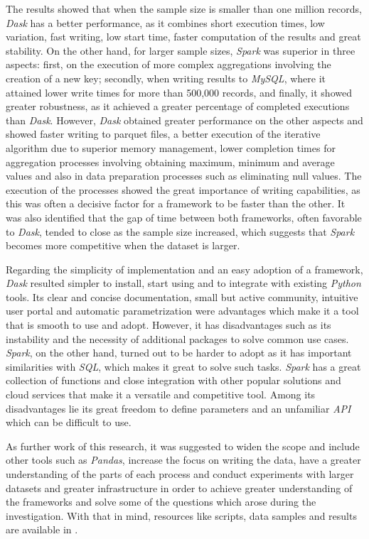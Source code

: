 \documentclass[11pt, oneside]{book}
\begin{document}
The results showed that when the sample size is smaller than one million records, \textit{Dask} has a better performance, as it combines short execution times, low variation, fast writing, low start time, faster computation of the results and great stability. On the other hand, for larger sample sizes, \textit{Spark} was superior in three aspects: first, on the execution of more complex aggregations involving the creation of a new key; secondly, when writing results to \textit{MySQL}, where it attained lower write times for more than 500,000 records, and finally, it showed greater robustness, as it achieved a greater percentage of completed executions than \textit{Dask}. However, \textit{Dask} obtained greater performance on the other aspects and showed faster writing to parquet files, a better execution of the iterative algorithm due to superior memory management, lower completion times for aggregation processes involving obtaining maximum, minimum and average values and also in data preparation processes such as eliminating null values. The execution of the processes showed the great importance of writing capabilities, as this was often a decisive factor for a framework to be faster than the other. It was also identified that the gap of time between both frameworks, often favorable to \textit{Dask}, tended to close as the sample size increased, which suggests that \textit{Spark} becomes more competitive when the dataset is larger. 

Regarding the simplicity of implementation and an easy adoption of a framework, \textit{Dask} resulted simpler to install, start using and to integrate with existing \textit{Python} tools. Its clear and concise documentation, small but active community, intuitive user portal and automatic parametrization were advantages which make it a tool that is smooth to use and adopt. However, it has disadvantages such as its instability and the necessity of additional packages to solve common use cases. \textit{Spark}, on the other hand, turned out to be harder to adopt as it has important similarities with \textit{SQL}, which makes it great to solve such tasks. \textit{Spark} has a  great collection of functions and close integration with other popular solutions and cloud services that make it a versatile and competitive tool. Among its disadvantages lie its great freedom to define parameters and an unfamiliar \textit{API} which can be difficult to use.

As further work of this research, it was suggested to widen the scope and include other tools such as \textit{Pandas}, increase the focus on writing the data, have a greater understanding of the parts of each process and conduct experiments with larger datasets and greater infrastructure in order to achieve greater understanding of the frameworks and solve some of the questions which arose during the investigation. With that in mind, resources like scripts, data samples and results are available in \cite{repo-spark-rita}.
\end{document}
